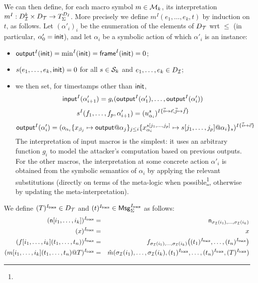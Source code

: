 We can then define, for each macro symbol $m\in\mathcal{M}_k$,
its interpretation $m^I : D_{\mathcal{I}}^k \times D_{\mathcal{T}} \to T_\Sigma^{D_I}$.
More precisely we define $m^I(e_1,\ldots,e_k,t)$ by induction on $t$,
as follows. Let $(\alpha'_i)_i$ be the enumeration of the elements
of $D_{\mathcal{T}}$ wrt $\leq$ (in particular, $\alpha'_0 = \mathsf{init}$), and let
$\alpha_i$ be a symbolic action of which $\alpha'_i$ is an instance:
\begin{itemize}
  \item $\textsf{output}^I(\mathsf{init}) = \min^I(\mathsf{init}) = \textsf{frame}^I(\mathsf{init}) = 0$;
  \item $s(e_1,\ldots,e_k,\mathsf{init}) = 0$ for all $s \in \mathcal{S}_k$ and
    $e_1,\ldots,e_k \in D_{\mathcal{I}}$;
  \item we then set, for timestamps other than $\mathsf{init}$,
    $$
    \textsf{input}^I(\alpha'_{i+1}) =
    g_{i}(\textsf{output}^I(\alpha'_1),\ldots,\textsf{output}^I(\alpha'_i))
    $$
    $$s^I(f_1,\ldots,f_p,\alpha'_{i+1}) =
    (
      u_{\alpha_{i}}^{s}
    )^{I\{\vec{i}\mapsto\vec{e},\vec{j}\mapsto\vec{f}\}}
    $$
    $$
    \mout^I(\alpha'_i) =
      \interp{
        o_{\alpha_i}
        \{x_{\beta_j}\mapsto\mout@\alpha_j\}_{j\leq i}
        \{x_{\alpha_i}^{s[j_1,\ldots,j_p]}\mapsto 
          s[j_1,\ldots,j_p]@\alpha_i\}_s
        }^{I\{\vec{i}\mapsto\vec{e}\}}
    $$
    The interpretation of input macros is the simplest:
    it uses an arbitrary function $g_i$ to model the attacker's
    computation based on previous outputs.
    For the other macros, the interpretation at some concrete
    action $\alpha'_i$ is obtained from the symbolic semantics of
    $\alpha_i$ by applying the relevant substitutions (directly
    on terms of the meta-logic when possible\footnote{
    }, otherwise by updating the meta-interpretation).
  \end{itemize}

\begin{definition}
  We define $(T)^{I_{\textsf{trace}}} \in D_{\mathcal{T}}$ and $(t)^{I_{\textsf{trace}}} \in \mathsf{Msg}^{I_{\textsf{trace}}}_\Sigma$ as follows:
  \begin{eqnarray*}
    (\mathsf{n}[i_1,\ldots,i_k])^{I_{\textsf{trace}}} &=& \mathsf{n}_{\sigma_{\mathcal{I}}(i_1),\ldots,\sigma_{\mathcal{I}}(i_k)}
    \\
    (x)^{I_{\textsf{trace}}} &=& x
    \\
    (f[i_1,\ldots,i_k](t_1,\ldots,t_n))^{I_{\textsf{trace}}} &=&
    f_{\sigma_{\mathcal{I}}(i_1),\ldots,\sigma_{\mathcal{I}}(i_k)}\bigl(
      (t_1)^{I_{\textsf{trace}}},\ldots,(t_n)^{I_{\textsf{trace}}}
    \bigr)
    \\
    (m[i_1,\ldots,i_k](t_1,\ldots,t_n)@T)^{I_{\textsf{trace}}} &=&
    \hat{m}(\sigma_{\mathcal{I}}(i_1),\ldots,\sigma_{\mathcal{I}}(i_k),
      (t_1)^{I_{\textsf{trace}}},\ldots,(t_n)^{I_{\textsf{trace}}},
      (T)^{I_{\textsf{trace}}})
  \end{eqnarray*}
\end{definition}

